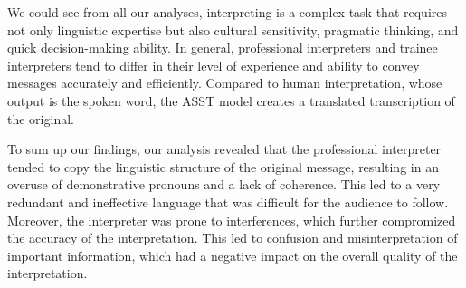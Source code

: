 \documentclass[output=paper]{langscibook}
\begin{document}
\begin{table}

\caption{The number of translation departures in both speeches interpreted by a professional (A), by trainee interpreters (B), and by ASST model (C).}
\label{tab:kloudova:9}
\end{table}

We could see from all our analyses, interpreting is a complex task that requires not only linguistic expertise but also cultural sensitivity, pragmatic thinking, and quick decision-making ability. In general, professional interpreters and trainee interpreters tend to differ in their level of experience and ability to convey messages accurately and efficiently. Compared to human interpretation, whose output is the spoken word, the ASST model creates a translated transcription of the original.

To sum up our findings, our analysis revealed that the professional interpreter tended to copy the linguistic structure of the original message, resulting in an overuse of demonstrative pronouns and a lack of coherence. This led to a very redundant and ineffective language that was difficult for the audience to follow. Moreover, the interpreter was prone to interferences, which further compromized the accuracy of the interpretation. This led to confusion and misinterpretation of important information, which had a negative impact on the overall quality of the interpretation.
\end{document}
